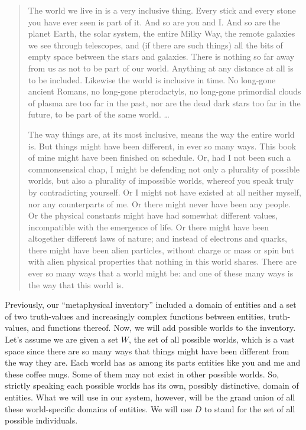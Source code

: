 \begin{quote}
	The world we live in is a very inclusive thing. Every stick and every stone you have ever seen is part of it. And so are you and I. And so are the planet Earth, the solar system, the entire Milky Way, the remote galaxies we see through telescopes, and (if there are such things) all the bits of empty space between the stars and galaxies. There is nothing so far away from us as not to be part of our world. Anything at any distance at all is to be included. Likewise the world is inclusive in time. No long-gone ancient Romans, no long-gone pterodactyls, no long-gone primordial clouds of plasma are too far in the past, nor are the dead dark stars too far in the future, to be part of the same world. \dots
	
	\medskip
	
	The way things are, at its most inclusive, means the way the entire world is. But things might have been different, in ever so many ways. This book of mine might have been finished on schedule. Or, had I not been such a commonsensical chap, I might be defending not only a plurality of possible worlds, but also a plurality of impossible worlds, whereof you speak truly by contradicting yourself. Or I might not have existed at all \dash neither myself, nor any counterparts of me. Or there might never have been any people. Or the physical constants might have had somewhat different values, incompatible with the emergence of life. Or there might have been altogether different laws of nature; and instead of electrons and quarks, there might have been alien particles, without charge or mass or spin but with alien physical properties that nothing in this world shares. There are ever so many ways that a world might be: and one of these many ways is the way that this world is.
\end{quote}
%
Previously, our ``metaphysical inventory'' included a domain of entities and a set of two truth-values and increasingly complex functions between entities, truth-values, and functions thereof. Now, we will add possible worlds to the inventory. Let's assume we are given a set $W$, the set of all possible worlds, which is a vast space since there are so many ways that things might have been different from the way they are. Each world has as among its parts entities like you and me and these coffee mugs. Some of them may not exist in other possible worlds. So, strictly speaking each possible worlds has its own, possibly distinctive, domain of entities. What we will use in our system, however, will be the grand union of all these world-specific domains of entities. We will use $D$ to stand for the set of all possible individuals.

